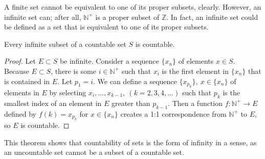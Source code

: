 \documentclass[12pt]{article}
\begin{document}
\begin{comm}
  A finite set cannot be equivalent to one of its proper subsets, clearly. However,
  an infinite set can; after all, $\mathbb{N}^+$ is a proper subset of $\mathbb{Z}$.
  In fact, an infinite set could be defined as a set that is equivalent to one of its
  proper subsets.
\end{comm}

\begin{thm}
  Every infinite subset of a countable set $S$ is countable.

  \begin{proof}
    Let $E \subset S$ be infinite. Consider a sequence $\{x_n\}$ of elements $x \in
    S$. Because $E \subset S$, there is some $i \in \mathbb{N}^+$ such that $x_i$ is
    the first element in $\{x_n\}$ that is contained in $E$. Let $p_1 = i$. We can define a sequence
    $\{x_{p_k}\},\ x \in \{x_n\}$ of elements in $E$ by selecting $x_i,\ldots,x_{k-1},\
    (k = 2,3,4,\ldots)$ such that $p_k$ is the smallest index of an element in $E$
    greater than $p_{k-1}$. Then a function $f: \mathbb{N}^+ \to E$ defined by $f(k)
    = x_{p_k}$ for $x \in \{x_n\}$ creates a 1:1 correspondence from $\mathbb{N}^+$
    to $E$, so $E$ is countable.
  \end{proof}
\end{thm}

\begin{comm}
  This theorem shows that countability of sets is the  form of infinity
  in a sense, as an uncountable set cannot be a subset of a countable set.
\end{comm}
\end{document}
